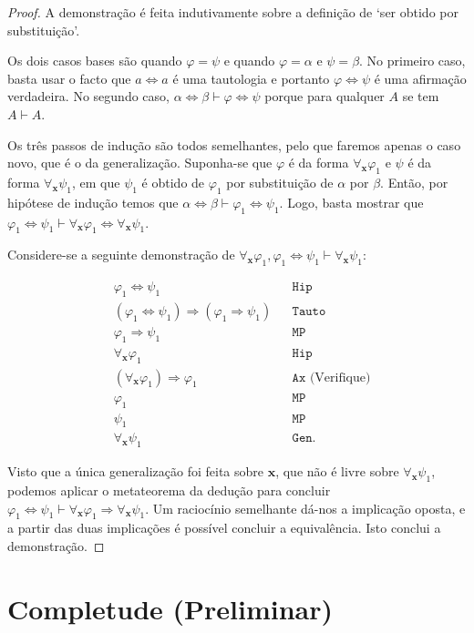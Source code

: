 \documentclass{report}
\theoremstyle{definition}
\theoremstyle{remark}
\renewcommand{\bf}[1]{\mathbf{#1}}
\newcommand{\imply}{\mathbin{\Rightarrow}}
\newcommand{\eqv}{\mathbin{\Leftrightarrow}}
\begin{document}
	\begin{proof}
	A demonstração é feita indutivamente sobre a definição de `ser obtido por substituição'.

	Os dois casos bases são quando $\varphi = \psi$ e quando $\varphi = \alpha$ e $\psi = \beta$. No primeiro caso, basta usar o facto que $a \eqv a$ é uma tautologia e portanto $\varphi \eqv \psi$ é uma afirmação verdadeira. No segundo caso, $\alpha \eqv \beta \vdash \varphi \eqv \psi$ porque para qualquer $A$ se tem $A \vdash A$.

	Os três passos de indução são todos semelhantes, pelo que faremos apenas o caso novo, que é o da generalização. Suponha-se que $\varphi$ é da forma $\forall_{\bf x} \varphi_1$ e $\psi$ é da forma $\forall_{\bf x} \psi_1$, em que $\psi_1$ é obtido de $\varphi_1$ por substituição de $\alpha$ por $\beta$. Então, por hipótese de indução temos que $\alpha \eqv \beta \vdash \varphi_1 \eqv \psi_1$. Logo, basta mostrar que $\varphi_1 \eqv \psi_1 \vdash \forall_{\bf x} \varphi_1 \eqv \forall_{\bf x} \psi_1$.

	Considere-se a seguinte demonstração de $\forall_{\bf x} \varphi_1, \varphi_1 \eqv \psi_1 \vdash \forall_{\bf x} \psi_1$:

\begin{align*}
&\varphi_1 \eqv \psi_1&&\mathtt{Hip}\\
&(\varphi_1 \eqv \psi_1 ) \imply (\varphi_1 \imply \psi_1)&&\mathtt{Tauto}\\
&\varphi_1 \imply \psi_1&&\mathtt{MP}\\
&\forall_{\bf x} \varphi_1&&\mathtt{Hip}\\
&(\forall_{\bf x} \varphi_1) \imply \varphi_1&&\mathtt{Ax}\text{ (Verifique)}\\
&\varphi_1&&\mathtt{MP}\\
&\psi_1&&\mathtt{MP}\\
&\forall_{\bf x} \psi_1&&\mathtt{Gen}.
\end{align*}

	Visto que a única generalização foi feita sobre $\bf x$, que não é livre sobre $\forall_{\bf x} \psi_1$, podemos aplicar o metateorema da dedução para concluir $\varphi_1 \eqv \psi_1 \vdash \forall_{\bf x} \varphi_1 \imply \forall_{\bf x} \psi_1$. Um raciocínio semelhante dá-nos a implicação oposta, e a partir das duas implicações é possível concluir a equivalência. Isto conclui a demonstração.
	\end{proof}
	
	\section{Completude (Preliminar)}
	\setcounter{ideia}{0}
	\setcounter{obstaculo}{0}
	
\end{document}
